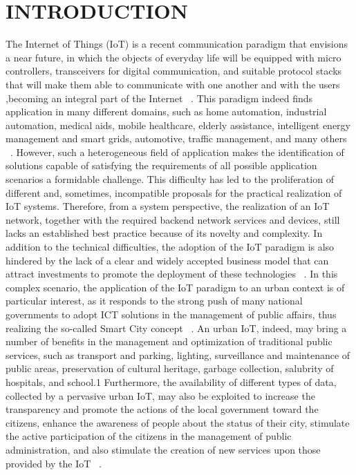 \documentclass[conference,column]{IEEEtran}
\begin{document}
\section{INTRODUCTION}
The Internet of Things (IoT) is a recent communication paradigm that envisions a near future, in which the objects of everyday life will be equipped with micro controllers, transceivers for digital communication,
and suitable protocol stacks that will make them able to communicate with one another and with the users ,becoming an integral part of the Internet ~\cite{r1}. This paradigm indeed finds application in many different domains, such as home automation, industrial automation, medical aids, mobile healthcare, elderly assistance, intelligent
energy management and smart grids, automotive, traffic management, and many others ~\cite{r2}. However, such a
heterogeneous field of application makes the identification of solutions capable of satisfying the requirements of all possible application scenarios a formidable challenge. This difficulty has led to the proliferation of different and, sometimes, incompatible proposals for the practical realization of IoT systems. Therefore, from a system perspective, the realization of an IoT network, together with the required backend network services and devices, still lacks an established best practice because of its novelty and complexity. In addition to the technical difficulties, the adoption of the IoT paradigm is also hindered by the lack of a clear and widely accepted business model that can attract investments to promote the deployment of these technologies ~\cite{r3}. In this complex scenario, the application of the IoT paradigm to an urban context is of particular interest, as it responds to the strong push of many national governments to adopt ICT solutions in the management of public affairs, thus realizing the so-called Smart City concept ~\cite{r4}. An urban IoT, indeed, may bring a number of benefits in the management and optimization of traditional public services, such as transport and parking, lighting, surveillance and maintenance of public areas, preservation of cultural heritage, garbage collection, salubrity of hospitals, and school.1 Furthermore, the availability of different types of data, collected by a pervasive urban IoT, may also be exploited to increase the transparency and promote the actions of the local government toward the citizens, enhance the awareness of people about the status of their city, stimulate the active participation of the citizens in the management of public administration, and also stimulate the creation of new services
upon those provided by the IoT ~\cite{r5}.
\end{document}
